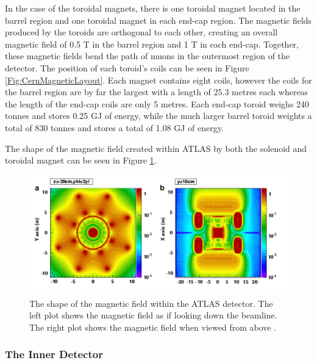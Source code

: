 \documentclass[12pt,a4paper,epsf,portrait,times,epsfig]{article}
\begin{document}
		In the case of the toroidal magnets, there is one toroidal magnet located in the barrel region and one toroidal magnet in each end-cap region. The magnetic fields produced by the toroids are orthogonal to each other, creating an overall magnetic field of 0.5 T in the barrel region and 1 T in each end-cap. Together, these magnetic fields bend the path of muons in the outermost region of the detector. The position of each toroid's coils can be seen in Figure \ref{Fig:CernMagneticLayout}. Each magnet contains eight coils, however the coils for the barrel region are by far the largest with a length of 25.3 metres each whereas the length of the end-cap coils are only 5 metres. Each end-cap toroid weighs 240 tonnes and stores 0.25 GJ of energy, while the much larger barrel toroid weights a total of 830 tonnes and stores a total of 1.08 GJ of energy. 
		
		The shape of the magnetic field created within ATLAS by both the solenoid and toroidal magnet can be seen in Figure \ref{Fig:CernMagneticField}. 
		
		\begin{figure}
			\centering
			\includegraphics[scale=0.4]{Magnetic_Field}
			\caption{The shape of the magnetic field within the ATLAS detector. The left plot shows the magnetic field as if looking down the beamline. The right plot shows the magnetic field when viewed from above \cite{Article:CernMagnets}. }
			\label{Fig:CernMagneticField}
		\end{figure}


		\subsubsection{The Inner Detector}\label{Section:InnerDetector}
\end{document}
